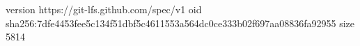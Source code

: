 version https://git-lfs.github.com/spec/v1
oid sha256:7dfe4453fee5c134f51dbf5c4611553a564dc0ce333b02f697aa08836fa92955
size 5814

